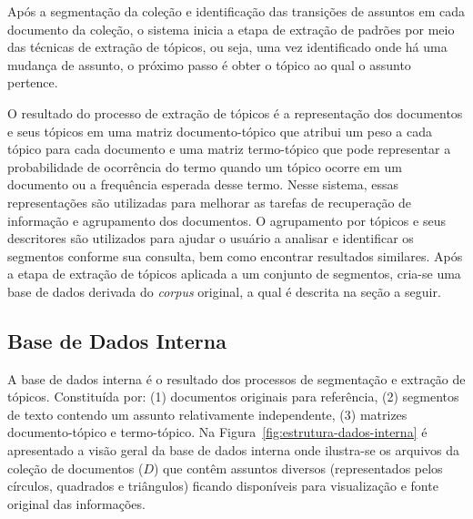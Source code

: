 Após a segmentação da coleção e identificação das transições de assuntos em cada documento da coleção, o sistema inicia a etapa de extração de padrões por meio das técnicas de extração de tópicos, ou seja, uma vez identificado onde há uma mudança de assunto, o próximo passo é obter o tópico ao qual o assunto pertence.

O resultado do processo de extração de tópicos é a representação dos documentos e seus tópicos em uma matriz documento-tópico que atribui um peso a cada tópico para cada documento e uma matriz termo-tópico que pode representar a probabilidade de ocorrência do termo quando um tópico ocorre em um documento ou a frequência esperada desse termo.  
Nesse sistema, essas representações são utilizadas para melhorar as tarefas de recuperação de informação e agrupamento dos documentos. 
O agrupamento por tópicos e seus descritores são utilizados para ajudar o usuário a analisar e identificar os segmentos conforme sua consulta, bem como encontrar resultados similares. 
Após a etapa de extração de tópicos aplicada a um conjunto de segmentos,  cria-se uma base de dados derivada do \textit{corpus} original, a qual é descrita na seção a seguir.








\subsection{Base de Dados Interna}

A base de dados interna é o resultado dos processos de segmentação e extração de tópicos. Constituída por: 
(1) documentos originais para referência, 
(2) segmentos de texto contendo um assunto relativamente independente,
(3) matrizes documento-tópico e termo-tópico.
Na Figura~\ref{fig:estrutura-dados-interna} é apresentado a visão geral da base de dados interna onde ilustra-se os arquivos da coleção de documentos ($D$) que contêm assuntos diversos (representados pelos círculos, quadrados e triângulos) ficando disponíveis para visualização e fonte original das informações. 





